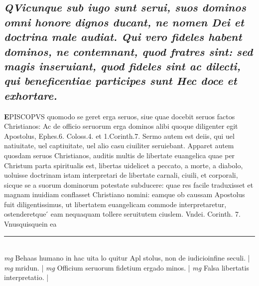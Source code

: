 \documentclass{article}
\begin{document}
\begin{pages}
\subsection*{\textit{\huge\textbf{Q}\normalsize Vicunque sub iugo sunt serui, suos dominos omni honore dignos ducant, ne nomen Dei et doctrina male audiat. Qui vero fideles habent dominos, ne contemnant, quod fratres sint: sed magis inseruiant, quod fideles sint ac dilecti, qui beneficentiae participes sunt Hec doce et exhortare. }}\pstart \huge\textbf{E}\normalsize PISCOPVS quomodo se geret erga seruos, siue quae docebit seruos factos Christianos: Ac de officio seruorum erga dominos alibi quoque diligenter egit Apostolus, Ephes.6. Coloss.4. et 1.Corinth.7. Sermo autem est deiis, qui uel natiuitate, uel captiuitate, uel alio casu ciuiliter seruiebant. Apparet autem quosdam seruos Christianos, auditis multis de libertate euangelica quae per Christum parta spiritualis est, libertas uidelicet a peccato, a morte, a diabolo, uoluisse doctrinam istam interpretari de libertate carnali, ciuili, et corporali, sicque se a suorum dominorum potestate subducere: quae res facile traduxisset et magnam inuidiam conflasset Christiano nomini: eamque ob caussam Apostolus fuit diligentissimus, ut libertatem euangelicam commode interpretaretur, ostenderetque ́ eam nequaquam tollere seruitutem ciuslem. Vndei. Corinth. 7. Vnusquisquein ea  \pend\pstart \huge\textbf{}\normalsize  \pend
\vspace{0.5cm}\noindent
\vspace{0.2cm}\rule{1cm}{0.2pt}\\ 
\hspace{0.2cm}\textit{mg}
\footnotesize Behaas humano in hac uita lo quitur Apl stolus, non de iudicioinfine seculi. 
\normalsize| 
\hspace{0.2cm}\textit{mg}
\footnotesize mridun. 
\normalsize| 
\hspace{0.2cm}\textit{mg}
\footnotesize Officium seruorum fidetium ergado minos. 
\normalsize| 
\hspace{0.2cm}\textit{mg}
\footnotesize Falsa libertatis interpretatio. 
\normalsize| 

\end{pages}
\end{document}

